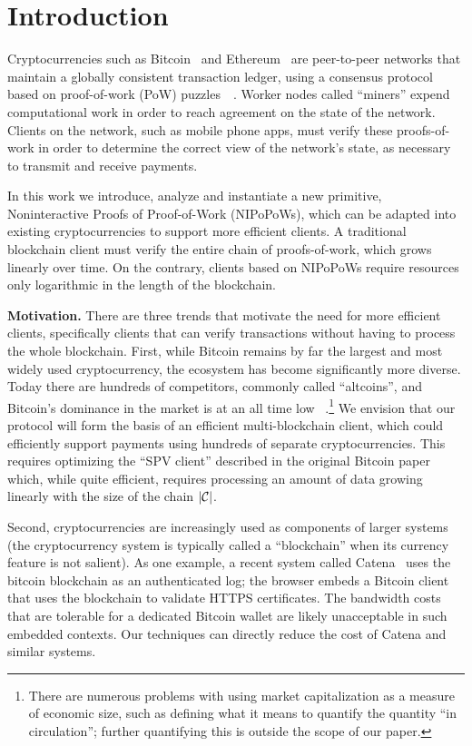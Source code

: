 \section{Introduction}

Cryptocurrencies such as Bitcoin~\cite{bitcoin}\cite{bitcoinsoftware} and
Ethereum~\cite{ethereum} are
peer-to-peer networks that maintain a globally consistent transaction ledger,
using a consensus protocol based on proof-of-work (PoW)
puzzles~\cite{pow}~\cite{hashcash}. Worker nodes called ``miners'' expend
computational work in order to reach agreement on the state of the network.
Clients on the network, such as mobile phone apps, must verify these
proofs-of-work in order to determine the correct view of the network's state, as
necessary to transmit and receive payments.

In this work we introduce, analyze and instantiate a new primitive,
Noninteractive Proofs of Proof-of-Work (NIPoPoWs), which can be adapted into
existing cryptocurrencies to support more efficient clients. A traditional
blockchain client must verify the entire chain of proofs-of-work, which grows
linearly over time. On the contrary, clients based on NIPoPoWs require resources
only logarithmic in the length of the blockchain.

\textbf{Motivation.}
There are three trends that motivate the need for more efficient clients,
specifically clients that can verify transactions without having to process the
whole blockchain. First, while Bitcoin remains by far the largest and most
widely used cryptocurrency, the ecosystem has become significantly more diverse.
Today there are hundreds of competitors, commonly called ``altcoins'', and
Bitcoin's dominance in the market is at an all time low
~\cite{marketcap}.\footnote{There are numerous problems with using  market
capitalization as a measure of economic size, such as defining what it means to
quantify the quantity ``in circulation''; further quantifying this is outside
the scope of our paper.} We envision that our protocol will form the basis of an
efficient multi-blockchain client, which could efficiently support payments
using hundreds of separate cryptocurrencies. This requires optimizing the
``SPV client'' described in the original Bitcoin paper~\cite{bitcoin} which,
while quite efficient, requires processing an amount of data growing linearly
with the size of the chain $|\mathcal{C}|$.

Second, cryptocurrencies are increasingly used as components of larger systems
(the cryptocurrency system is typically called a ``blockchain'' when its
currency feature is not salient). As one example, a recent system called
Catena~\cite{catena} uses the bitcoin blockchain as an authenticated log; the
browser embeds a Bitcoin client that uses the blockchain to validate HTTPS
certificates. The bandwidth costs that are tolerable for a dedicated Bitcoin
wallet are likely unacceptable in such embedded contexts. Our techniques can
directly reduce the cost of Catena and similar systems.

